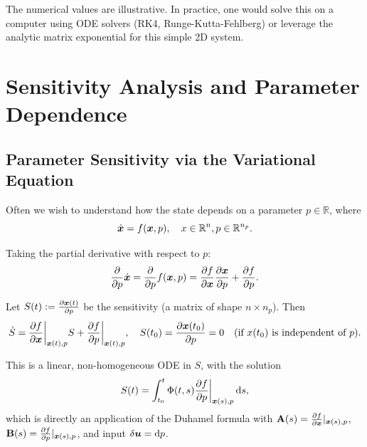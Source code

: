 \begin{remark}
The numerical values are illustrative. In practice, one would solve this on a computer using ODE solvers
(RK4, Runge-Kutta-Fehlberg) or leverage the analytic matrix exponential for this simple 2D system.
\end{remark}


\section{Sensitivity Analysis and Parameter Dependence}

\subsection{Parameter Sensitivity via the Variational Equation}

Often we wish to understand how the state depends on a parameter $p \in \mathbb{R}$, where
\begin{equation}
\dot{\bm{x}} = f(\bm{x}, p), \quad x\in\mathbb{R}^n, p \in \mathbb{R}^{n_p}.
\label{eq:ch2:param-system}
\end{equation}

Taking the partial derivative with respect to $p$:
\begin{equation}
\frac{\partial}{\partial p}\dot{\bm{x}} = \frac{\partial}{\partial p}f(\bm{x},p) = \frac{\partial f}{\partial \bm{x}}\frac{\partial \bm{x}}{\partial p}
+ \frac{\partial f}{\partial p}.
\end{equation}

Let $S(t) := \frac{\partial \bm{x}(t)}{\partial p}$ be the sensitivity (a matrix of shape $n \times n_p$).
Then
\begin{equation}
\dot S = \frac{\partial f}{\partial \bm{x}}\bigg|_{\bm{x}(t),p} S + \frac{\partial f}{\partial p}\bigg|_{\bm{x}(t),p},
\quad S(t_0) = \frac{\partial \bm{x}(t_0)}{\partial p} = 0 \quad \text{(if } x(t_0) \text{ is independent of } p\text{)}.
\label{eq:ch2:sensitivity-ode}
\end{equation}

This is a linear, non-homogeneous ODE in $S$, with the solution
\begin{equation}
S(t) = \int_{t_0}^{t}\Phi(t,s)\frac{\partial f}{\partial p}\bigg|_{\bm{x}(s),p}\,\mathrm{d} s,
\label{eq:ch2:sensitivity-duhamel}
\end{equation}
which is directly an application of the Duhamel formula with $\mathbf{A}(s) = \frac{\partial f}{\partial\bm{x}}|_{\bm{x}(s),p}$,
$\mathbf{B}(s) = \frac{\partial f}{\partial p}|_{\bm{x}(s),p}$, and input $\delta\bm{u} = \mathrm{d} p$.

